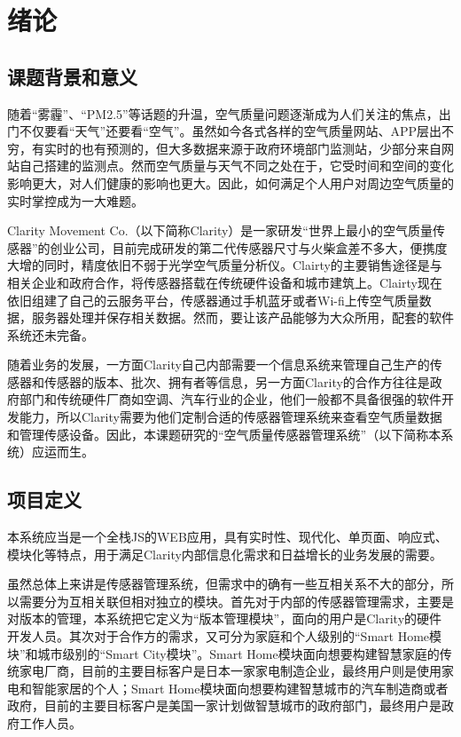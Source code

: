 
\chapter{绪论}
\label{chap:intro}
\section{课题背景和意义}
随着“雾霾”、“PM2.5”等话题的升温，空气质量问题逐渐成为人们关注的焦点，出门不仅要看“天气”还要看“空气”。虽然如今各式各样的空气质量网站、APP层出不穷，有实时的也有预测的，但大多数据来源于政府环境部门监测站，少部分来自网站自己搭建的监测点。然而空气质量与天气不同之处在于，它受时间和空间的变化影响更大，对人们健康的影响也更大。因此，如何满足个人用户对周边空气质量的实时掌控成为一大难题。

Clarity Movement Co.（以下简称Clarity）是一家研发“世界上最小的空气质量传感器”的创业公司，目前完成研发的第二代传感器尺寸与火柴盒差不多大，便携度大增的同时，精度依旧不弱于光学空气质量分析仪。Clairty的主要销售途径是与相关企业和政府合作，将传感器搭载在传统硬件设备和城市建筑上。Clairty现在依旧组建了自己的云服务平台，传感器通过手机蓝牙或者Wi-fi上传空气质量数据，服务器处理并保存相关数据。然而，要让该产品能够为大众所用，配套的软件系统还未完备。

随着业务的发展，一方面Clarity自己内部需要一个信息系统来管理自己生产的传感器和传感器的版本、批次、拥有者等信息，另一方面Clarity的合作方往往是政府部门和传统硬件厂商如空调、汽车行业的企业，他们一般都不具备很强的软件开发能力，所以Clarity需要为他们定制合适的传感器管理系统来查看空气质量数据和管理传感设备。因此，本课题研究的“空气质量传感器管理系统”（以下简称本系统）应运而生。

\section{项目定义}
本系统应当是一个全栈JS的WEB应用，具有实时性、现代化、单页面、响应式、模块化等特点，用于满足Clarity内部信息化需求和日益增长的业务发展的需要。

虽然总体上来讲是传感器管理系统，但需求中的确有一些互相关系不大的部分，所以需要分为互相关联但相对独立的模块。首先对于内部的传感器管理需求，主要是对版本的管理，本系统把它定义为“版本管理模块”，面向的用户是Clarity的硬件开发人员。其次对于合作方的需求，又可分为家庭和个人级别的“Smart Home模块”和城市级别的“Smart City模块”。Smart Home模块面向想要构建智慧家庭的传统家电厂商，目前的主要目标客户是日本一家家电制造企业，最终用户则是使用家电和智能家居的个人；Smart Home模块面向想要构建智慧城市的汽车制造商或者政府，目前的主要目标客户是美国一家计划做智慧城市的政府部门，最终用户是政府工作人员。

